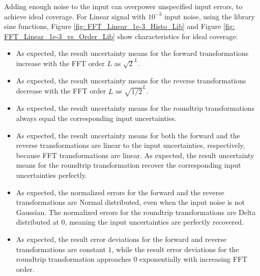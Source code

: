 \documentclass[twoside]{article}
\numberwithin{equation}{section}
\begin{document}
Adding enough noise to the input can overpower unspecified input errors, to achieve ideal coverage.
For Linear signal with $10^{-3}$ input noise, using the library sine functions, Figure \ref{fig: FFT_Linear_1e-3_Histo_Lib} and Figure \ref{fig:  FFT_Linear_1e-3_vs_Order_Lib} show characteristics for ideal coverage:  
\begin{itemize}
\item As expected, the result uncertainty means for the forward transformations increase with the FFT order $L$ as $\sqrt{2}^L$.

\item As expected, the result uncertainty means for the reverse transformations decrease with the FFT order $L$ as $\sqrt{1/2}^L$.

\item As expected, the result uncertainty means for the roundtrip transformations always equal the corresponding input uncertainties.

\item As expected, the result uncertainty means for both the forward and the reverse transformations are linear to the input uncertainties, respectively, because FFT transformations are linear.
As expected, the result uncertainty means for the roundtrip transformation recover the corresponding input uncertainties perfectly.

\item As expected, the normalized errors for the forward and the reverse transformations are Normal distributed, even when the input noise is not Gaussian.
The normalized errors for the roundtrip transformations are Delta distributed at $0$, meaning the input uncertainties are perfectly recovered.

\item As expected, the result error deviations for the forward and reverse transformations are constant $1$, while the result error deviations for the roundtrip transformation approaches $0$ exponentially with increasing FFT order.

\end{itemize}
\end{document}
